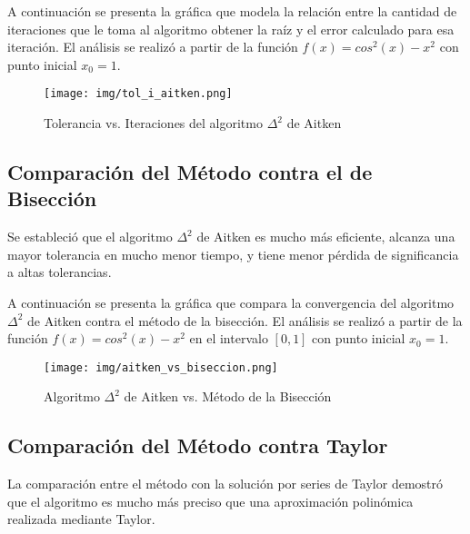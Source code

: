 \documentclass[a4paper,12pt]{article}
\begin{document}
A continuación se presenta la gráfica que modela la relación entre la cantidad de iteraciones que le toma al algoritmo obtener la raíz y el error calculado para esa iteración. El análisis se realizó a partir de la función $f(x)=cos^2(x)-x^2$ con punto inicial $x_0 = 1$. \par

\vspace{-1em}
\begin{figure}[ht!]
\centering
\texttt{[image: img/tol\_i\_aitken.png]}
\vspace{-1em}
\caption{Tolerancia vs. Iteraciones del algoritmo $\Delta^2$ de Aitken}
\label{fig:tol_i_aitken}
\end{figure}

\vspace{-1em}

\subsection{Comparación del Método contra el de Bisección}

Se estableció que el algoritmo $\Delta^2$ de Aitken es mucho más eficiente, alcanza una mayor tolerancia en mucho menor tiempo, y tiene menor pérdida de significancia a altas tolerancias. \par 

A continuación se presenta la gráfica que compara la convergencia del algoritmo $\Delta^2$ de Aitken contra el método de la bisección. El análisis se realizó a partir de la función $f(x)=cos^2(x)-x^2$ en el intervalo $[0,1]$ con punto inicial $x_0 = 1$. \par

\vspace{-1em}
\begin{figure}[ht!]
\centering
\texttt{[image: img/aitken\_vs\_biseccion.png]}
\vspace{-1em}
\caption{Algoritmo $\Delta^2$ de Aitken vs. Método de la Bisección}
\label{fig:aitken_biseccion}
\end{figure}

\newpage

\subsection{Comparación del Método contra Taylor}

La comparación entre el método con la solución por series de Taylor demostró que el algoritmo es mucho más preciso que una aproximación polinómica realizada mediante Taylor. \par 
\end{document}
